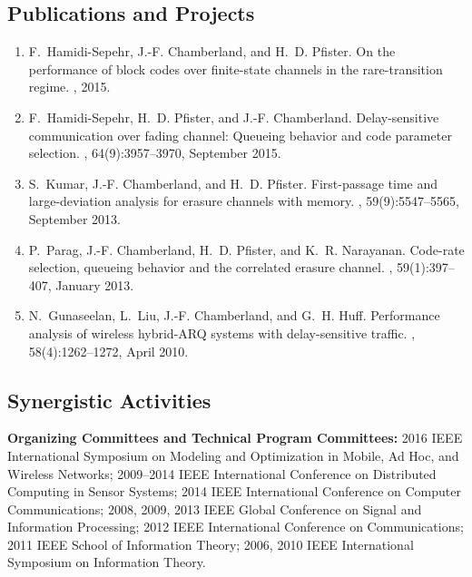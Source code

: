 \documentclass[11pt]{article}
\begin{document}
\subsection*{Publications and Projects}

\begin{enumerate}    \itemsep0pt
\item F.~Hamidi-Sepehr, J.-F. Chamberland, and H.~D. Pfister.
\newblock On the performance of block codes over finite-state channels in the
  rare-transition regime.
, 2015.

\item F.~Hamidi-Sepehr, H.~D. Pfister, and J.-F. Chamberland.
\newblock Delay-sensitive communication over fading channel: Queueing behavior
  and code parameter selection.
, 64(9):3957--3970,
  September 2015.

\item S.~Kumar, J.-F. Chamberland, and H.~D. Pfister.
\newblock First-passage time and large-deviation analysis for erasure channels
  with memory.
, 59(9):5547--5565,
  September 2013.

\item P.~Parag, J.-F. Chamberland, H.~D. Pfister, and K.~R. Narayanan.
\newblock Code-rate selection, queueing behavior and the correlated erasure
  channel.
, 59(1):397--407,
  January 2013.

\item N.~Gunaseelan, L.~Liu, J.-F. Chamberland, and G.~H. Huff.
\newblock Performance analysis of wireless hybrid-{ARQ} systems with
  delay-sensitive traffic.
, 58(4):1262--1272, April
  2010.
\end{enumerate}


\subsection*{Synergistic Activities}

\textbf{Organizing Committees and Technical Program Committees:}
2016 IEEE International Symposium on Modeling and Optimization in Mobile, Ad Hoc, and Wireless Networks;
2009--2014 IEEE International Conference on Distributed Computing in Sensor Systems;
2014 IEEE International Conference on Computer Communications;
2008, 2009, 2013 IEEE Global Conference on Signal and Information Processing;
2012 IEEE International Conference on Communications;
2011 IEEE School of Information Theory;
2006, 2010 IEEE International Symposium on Information Theory.
\end{document}
